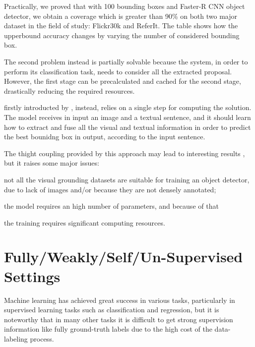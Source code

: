 Practically, we proved that with 100 bounding boxes and Faster-R CNN
object detector, we obtain a coverage which is greater than 90\% on
both two major dataset in the field of study: Flickr30k and ReferIt.
The table  shows how the upperbound accuracy changes
by varying the number of considered bounding box.

The second problem instead is partially solvable because the system,
in order to perform its classification task, needs to consider all the
extracted proposal. However, the first stage can be precalculated and
cached for the second stage, drastically reducing the required
resources. 

 firstly introducted by , instead, relies on a single step for
computing the solution. The model receives in input an image and a
textual sentence, and it should learn how to extract and fuse all the
visual and textual information in order to predict the best bounidng
box in output, according to the input sentence. 

The thight coupling provided by this approach may lead to interesting
results , but it raises some
major issues: \begin{enumerate*}[label=(\roman*)] \item not all the
visual grounding datasets are suitable for training an object
detector, due to lack of images and/or because they are not densely
annotated; \item the model requires an high number of parameters, and
because of that \item the training requires significant computing
resources. \end{enumerate*}

\section{Fully/Weakly/Self/Un-Supervised Settings}

Machine learning has achieved great success in various tasks,
particularly in supervised learning tasks such as classification and
regression, but it is noteworthy that in many other tasks it is
difficult to get strong supervision information like fully
ground-truth labels due to the high cost of the data-labeling process.

